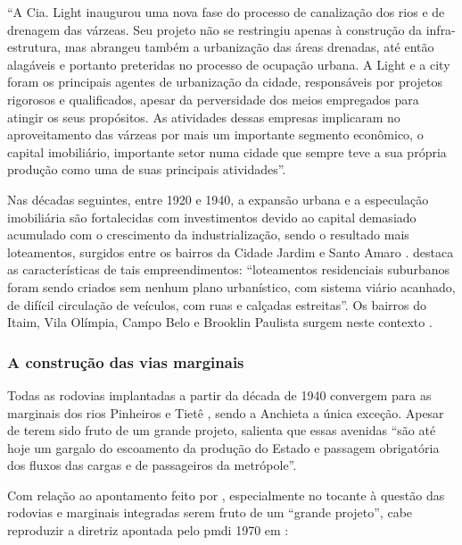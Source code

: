 \documentclass[
article,			%
11pt,				%
oneside,			%
a4paper,			%
english,			%
brazil,				%
sumario=tradicional
]{abntex2}
\begin{document}
	\begin{citacao}
		``A Cia. Light inaugurou uma nova fase do processo de canalização dos rios e de drenagem das várzeas. Seu projeto não se restringiu apenas à construção da infra-estrutura, mas abrangeu também a urbanização das áreas drenadas, até então alagáveis e portanto preteridas no processo de ocupação urbana. A Light e a \gls{city} foram os principais agentes de urbanização da cidade, responsáveis por projetos rigorosos e qualificados, apesar da perversidade dos meios empregados para atingir os seus propósitos. As atividades dessas empresas implicaram no aproveitamento das várzeas por mais um importante segmento econômico, o capital imobiliário, importante setor numa cidade que sempre teve a sua própria produção como uma de suas principais atividades''.
	\end{citacao}
	
	Nas décadas seguintes, entre 1920 e 1940, a expansão urbana e a especulação imobiliária são fortalecidas com investimentos devido ao capital demasiado acumulado com o crescimento da industrialização, sendo o resultado mais loteamentos, surgidos entre os bairros da Cidade Jardim e Santo Amaro  .   destaca as características de tais empreendimentos: ``loteamentos residenciais suburbanos foram sendo criados sem nenhum plano urbanístico, com sistema viário acanhado, de difícil circulação de veículos, com ruas e calçadas estreitas''. Os bairros do Itaim, Vila Olímpia, Campo Belo e Brooklin Paulista surgem neste contexto .
	
	\subsubsection{A construção das vias marginais} \label{s3:construindo}
	
	Todas as rodovias implantadas a partir da década de 1940 convergem para as marginais dos rios Pinheiros e Tietê \cite[p. 12]{franco2005a}, sendo a Anchieta a única exceção. Apesar de terem sido fruto de um grande projeto,  salienta que essas avenidas ``são até hoje um gargalo do escoamento da produção do Estado e passagem obrigatória dos fluxos das cargas e de passageiros da metrópole''.
	
	Com relação ao apontamento feito por , especialmente no tocante à questão das rodovias e marginais integradas serem fruto de um ``grande projeto'', cabe reproduzir a diretriz apontada pelo \gls{pmdi} 1970 em :
	
\end{document}
